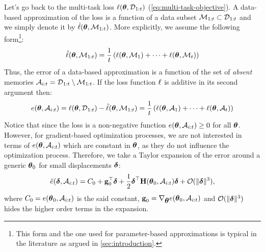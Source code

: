 \documentclass{article} %
\newcommand{\hessian}{\vH}
\newcommand{\memory}{\mathcal{M}}
\newcommand{\absent}{\mathcal{A}}
\begin{document}
Let's go back to the multi-task loss $\ell({\mbox{$\mbox{$\boldsymbol{\theta}$}$}, \mbox{${\cal D}$}_{1:t}})$ (\cref{eq:multi-task-objective}). A data-based approximation of the loss is a function of a data subset $\memory_{1:t} \subset \data_{1:t}$ and we simply denote it by $\hat{\loss}({\vparam, \memory_{1:t}})$. More explicitly, we assume the following form\footnote{This form and the one used for parameter-based approximations is typical in the literature as argued in \cref{sec:introduction}.}: 
\begin{equation}
\label{eq:data-based-approx}
    \hat{\loss}({\vparam, \memory_{1:t}}) = \frac{1}{t}\rnd{{\loss}({\vparam, \memory_{1}}) + \dots + {\loss}({\vparam, \memory_{t}})}
\end{equation}
Thus, the error of a data-based approximation is a function of the set of \emph{absent} memories $\absent_{i:t} = \data_{1:t}\setminus\memory_{1:t}$. If the loss function $\ell$ is additive in its second argument then: 
\begin{equation}
    e(\vparam, \absent_{i:t}) = \loss({\vparam, \data_{1:t}}) - \hat{\loss}({\vparam, \memory_{1:t}}) = \frac{1}{t}\rnd{{\loss}({\vparam, \absent_{1}}) + \dots + {\loss}({\vparam, \absent_{t}})}
\end{equation}
Notice that since the loss is a non-negative function $e(\vparam, \absent_{i:t}) \ge 0$ for all $\mbox{$\mbox{$\boldsymbol{\theta}$}$}$. However, for gradient-based optimization processes, we are not interested in terms of $e(\vparam, \absent_{i:t})$ which are constant in $\mbox{$\mbox{$\boldsymbol{\theta}$}$}$, as they do not influence the optimization process. Therefore, we take a Taylor expansion of the error around a generic $\mbox{$\mbox{$\boldsymbol{\theta}$}$}_0$ for small displacements $\mbox{$\mbox{$\boldsymbol{\delta}$}$}$: 
\begin{equation}
\label{eq:approximate-error}
    \tilde{e}(\vdelta, \absent_{i:t}) = C_0 + \vg_0^\top \vdelta + \frac{1}{2}\vdelta^\top \hessian(\vparam_0, \absent_{i:t})\vdelta + \mathcal{O}(\|\vdelta\|^3),
\end{equation}
where $C_0 = {e}(\vparam_0, \absent_{i:t})$ is the said constant, $\vg_0 = \nabla_{\vparam}{e}(\vparam_0, \absent_{i:t})$ and $\mathcal{O}(\|\mbox{$\mbox{$\boldsymbol{\delta}$}$}\|^3)$ hides the higher order terms in the expansion. 
\end{document}
